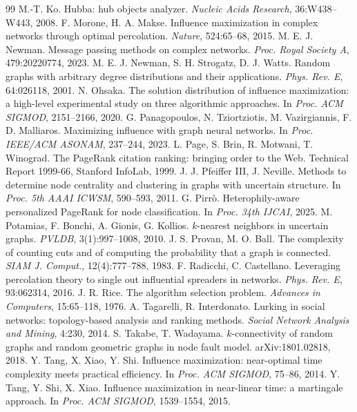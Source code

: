 \documentclass[11pt,a4paper]{article}
\begin{document}
\begin{thebibliography}{99}
M.-T. Ko. Hubba: hub objects analyzer. \emph{Nucleic Acids Research},
36:W438--W443, 2008.
 F. Morone, H. A. Makse. Influence maximization in complex
networks through optimal percolation. \emph{Nature}, 524:65--68, 2015.
 M. E. J. Newman. Message passing methods on complex networks.
\emph{Proc. Royal Society A}, 479:20220774, 2023.
 M. E. J. Newman, S. H. Strogatz, D. J. Watts. Random graphs with
arbitrary degree distributions and their applications. \emph{Phys. Rev. E},
64:026118, 2001.
 N. Ohsaka. The solution distribution of influence
maximization: a high-level experimental study on three algorithmic
approaches. In \emph{Proc. ACM SIGMOD}, 2151--2166, 2020.
 G. Panagopoulos, N. Tziortziotis, M. Vazirgiannis,
F. D. Malliaros. Maximizing influence with graph neural networks. In
\emph{Proc. IEEE/ACM ASONAM}, 237--244, 2023.
 L. Page, S. Brin, R. Motwani, T. Winograd. The PageRank
citation ranking: bringing order to the Web. Technical Report 1999-66, Stanford
InfoLab, 1999.
 J. J. Pfeiffer III, J. Neville. Methods to determine node
centrality and clustering in graphs with uncertain structure. In \emph{Proc. 5th
AAAI ICWSM}, 590--593, 2011.
 G. Pirr\`o. Heterophily-aware personalized PageRank for
node classification. In \emph{Proc. 34th IJCAI}, 2025.
 M. Potamias, F. Bonchi, A. Gionis, G. Kollios.
$k$-nearest neighbors in uncertain graphs. \emph{PVLDB}, 3(1):997--1008, 2010.
 J. S. Provan, M. O. Ball. The complexity of counting cuts
and of computing the probability that a graph is connected. \emph{SIAM J.
Comput.}, 12(4):777--788, 1983.
 F. Radicchi, C. Castellano. Leveraging percolation theory
to single out influential spreaders in networks. \emph{Phys. Rev. E},
93:062314, 2016.
 J. R. Rice. The algorithm selection problem. \emph{Advances in
Computers}, 15:65--118, 1976.
 A. Tagarelli, R. Interdonato. Lurking in social networks:
topology-based analysis and ranking methods. \emph{Social Network Analysis and
Mining}, 4:230, 2014.
 S. Takabe, T. Wadayama. $k$-connectivity of random graphs and
random geometric graphs in node fault model. arXiv:1801.02818, 2018.
 Y. Tang, X. Xiao, Y. Shi. Influence maximization: near-optimal
time complexity meets practical efficiency. In \emph{Proc. ACM SIGMOD}, 75--86,
2014.
 Y. Tang, Y. Shi, X. Xiao. Influence maximization in near-linear
time: a martingale approach. In \emph{Proc. ACM SIGMOD}, 1539--1554, 2015.

\end{thebibliography}
\end{document}
